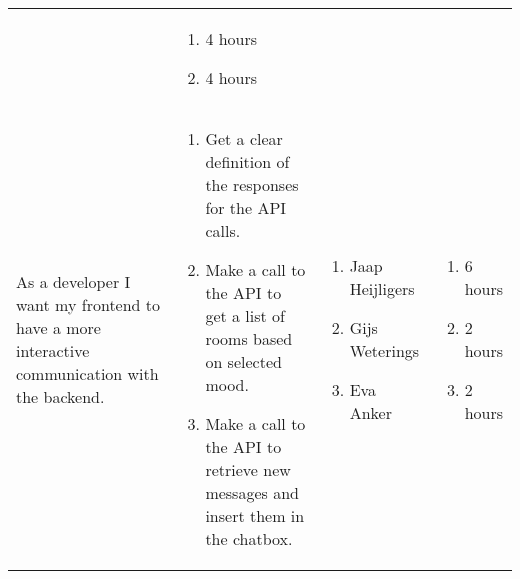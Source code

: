 \documentclass[11pt,a4paper]{article}
\begin{document}
\begin{table}[h]
\begin{tabular}{|p{4.5cm}|p{7cm}|p{4cm}|p{2.6cm}|}
&

\begin{enumerate}
\item 4 hours
\item 4 hours
\end{enumerate}

\\

As a developer I want my frontend to have a more interactive communication with the backend.
&
\begin{enumerate}
\item Get a clear definition of the responses for the API calls.
\item Make a call to the API to get a list of rooms based on selected mood.
\item Make a call to the API to retrieve new messages and insert them in the chatbox.
\end{enumerate}

&

\begin{enumerate}
\item Jaap Heijligers
\item Gijs Weterings
\item Eva Anker
\end{enumerate}

&
\begin{enumerate}
\item 6 hours
\item 2 hours
\item 2 hours
\end{enumerate}
          
\end{tabular}
\end{table}
\end{document}
